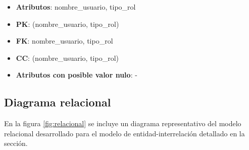 \documentclass[a4paper,11pt]{article}
\begin{document}
\begin{itemize}

\item 
\textbf{Atributos}: nombre\_usuario, tipo\_rol

\item 
\textbf{PK}: (nombre\_usuario, tipo\_rol)

\item
\textbf{FK}: nombre\_usuario, tipo\_rol 

\item 
\textbf{CC}: (nombre\_usuario, tipo\_rol)

\item 
\textbf{Atributos con posible valor nulo}: -

\end{itemize}

\newpage

\subsection{Diagrama relacional}

 En la figura \ref{fig:relacional} se incluye un diagrama representativo del
 modelo relacional desarrollado para el modelo de entidad-interrelación
 detallado en la sección.
\end{document}
